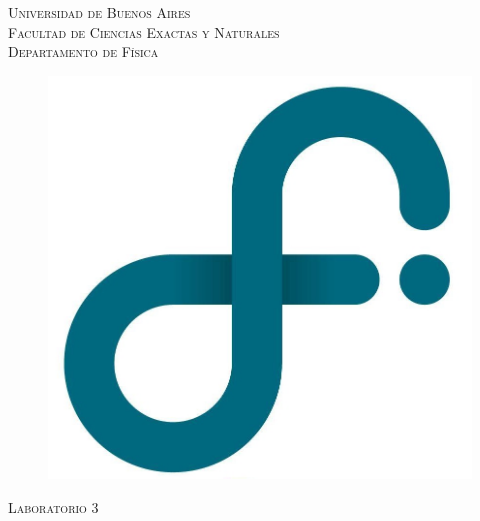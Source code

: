 \begin{titlepage}

\newcommand{\HRule}{\rule{\linewidth}{0.5mm}} %

\center %
 

\textsc{\Huge Universidad de Buenos Aires}\\[0.5cm]
\textsc{\LARGE Facultad de Ciencias Exactas y Naturales}\\[0.5cm] %
\textsc{\Large Departamento de Física}\\[0.25cm] %

\begin{figure}[h]
  \centering
  \includegraphics[scale=0.15]{Logo_DF}
  \\[0.5cm]
\end{figure}

\textsc{\large Laboratorio 3}\\[0.25cm] %



\end{titlepage}
